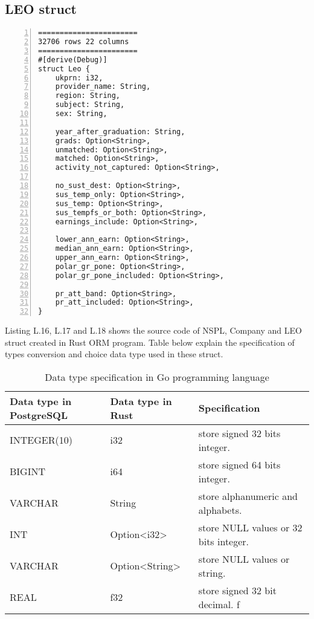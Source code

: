 \newpage

\subsection{LEO struct}

\lstset{basicstyle=\ttfamily\tiny}  
\begin{lstlisting}[breaklines, frame=single, numbers=left, caption={Source code for LEO struct. (leo.rs)}, label=commandline-02]
=======================
32706 rows 22 columns 
=======================
#[derive(Debug)]
struct Leo {
	ukprn: i32,
	provider_name: String,
	region: String,
	subject: String,
	sex: String,
	
	year_after_graduation: String,
	grads: Option<String>,
	unmatched: Option<String>,
	matched: Option<String>,
	activity_not_captured: Option<String>,
	
	no_sust_dest: Option<String>,
	sus_temp_only: Option<String>,
	sus_temp: Option<String>,
	sus_tempfs_or_both: Option<String>,
	earnings_include: Option<String>,
	
	lower_ann_earn: Option<String>,
	median_ann_earn: Option<String>,
	upper_ann_earn: Option<String>,
	polar_gr_pone: Option<String>,
	polar_gr_pone_included: Option<String>,
	
	pr_att_band: Option<String>,
	pr_att_included: Option<String>,
}

\end{lstlisting}

Listing L.16, L.17 and L.18 shows the source code of NSPL, Company and LEO struct created in Rust ORM program.  Table below explain the specification of types conversion and choice data type used in these struct. 

\begin{table}[H]
	\centering
	\begin{tabulary}{1.0\textwidth}{|L|L|L|}
		\hline
		{\textbf{Data type in PostgreSQL}} & {\bf Data type in Rust} & {\bf Specification}  \\ \hline
		INTEGER(10)						  & i32      			  & store signed 32 bits integer.                    \\ \hline
		BIGINT	&					i64     		& store signed 64 bits integer.                     \\ \hline
		VARCHAR & String       	& store alphanumeric and alphabets.                        \\ \hline
		INT  & Option<i32>   & store NULL values or 32 bits integer.                                \\ \hline
		VARCHAR & Option<String>  & store NULL values or string.                               \\ \hline
		REAL  & f32       	& store signed 32 bit decimal.           f                       \\ \hline
	\end{tabulary}
	\caption{Data type specification in Go programming language}
\end{table}

